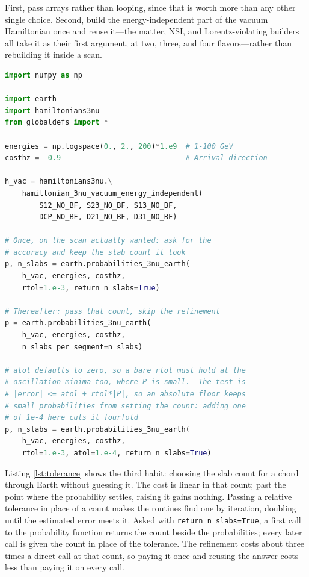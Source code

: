 \documentclass[final,5p,times,twocolumn,sort,compress]{elsarticle}
\begin{document}
First, pass arrays rather than looping, since that is worth more than any other single choice.  Second, build the energy-independent part of the vacuum Hamiltonian once and reuse it---the matter, NSI, and Lorentz-violating builders all take it as their first argument, at two, three, and four flavors---rather than rebuilding it inside a scan.

\begin{lstlisting}[language=Python, caption={Choosing the slab count once and reusing it.  A relative tolerance makes the {\tt earth} routines refine until the estimated error meets it, doubling the count as they go; {\tt return\_n\_slabs} hands back the count they settled on, which every later call can be given directly.  The two calls here return identical arrays, the second repeating the last evaluation the first performed.}, label={lst:tolerance}, float=t]
import numpy as np

import earth
import hamiltonians3nu
from globaldefs import *

energies = np.logspace(0., 2., 200)*1.e9  # 1-100 GeV
costhz = -0.9                             # Arrival direction

h_vac = hamiltonians3nu.\
    hamiltonian_3nu_vacuum_energy_independent(
        S12_NO_BF, S23_NO_BF, S13_NO_BF,
        DCP_NO_BF, D21_NO_BF, D31_NO_BF)

# Once, on the scan actually wanted: ask for the
# accuracy and keep the slab count it took
p, n_slabs = earth.probabilities_3nu_earth(
    h_vac, energies, costhz,
    rtol=1.e-3, return_n_slabs=True)

# Thereafter: pass that count, skip the refinement
p = earth.probabilities_3nu_earth(
    h_vac, energies, costhz,
    n_slabs_per_segment=n_slabs)

# atol defaults to zero, so a bare rtol must hold at the
# oscillation minima too, where P is small.  The test is
# |error| <= atol + rtol*|P|, so an absolute floor keeps
# small probabilities from setting the count: adding one
# of 1e-4 here cuts it fourfold
p, n_slabs = earth.probabilities_3nu_earth(
    h_vac, energies, costhz,
    rtol=1.e-3, atol=1.e-4, return_n_slabs=True)
\end{lstlisting}

Listing \ref{lst:tolerance} shows the third habit: choosing the slab count for a chord through Earth without guessing it.  The cost is linear in that count; past the point where the probability settles, raising it gains nothing.  Passing a relative tolerance in place of a count makes the routines find one by iteration, doubling until the estimated error meets it.  Asked with {\tt return\_n\_slabs=True}, a first call to the probability function returns the count beside the probabilities; every later call is given the count in place of the tolerance.  The refinement costs about three times a direct call at that count, so paying it once and reusing the answer costs less than paying it on every call.
\end{document}
